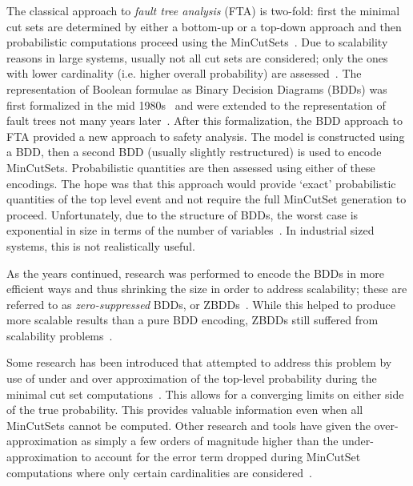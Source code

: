 The classical approach to \textit{fault tree analysis} (FTA) is two-fold: first the minimal cut sets are determined by either a bottom-up or a top-down approach and then probabilistic computations proceed using the MinCutSets~\cite{vesely1981fault,henley1996probabilistic,rausand2003system}. Due to scalability reasons in large systems, usually not all cut sets are considered; only the ones with lower cardinality (i.e. higher overall probability) are assessed~\cite{vesely1981fault,Bozzano:2010:DSA:1951720}. The representation of Boolean formulae as Binary Decision Diagrams (BDDs) was first formalized in the mid 1980s~\cite{bryant1986graph} and were extended to the representation of fault trees not many years later~\cite{rauzy1993new}. After this formalization, the BDD approach to FTA provided a new approach to safety analysis. The model is constructed using a BDD, then a second BDD (usually slightly restructured) is used to encode MinCutSets\cite{rauzy2008binary}. Probabilistic quantities are then assessed using either of these encodings. The hope was that this approach would provide `exact' probabilistic quantities of the top level event and not require the full MinCutSet generation to proceed. Unfortunately, due to the structure of BDDs, the worst case is exponential in size in terms of the number of variables~\cite{bryant1986graph,rauzy1993new,rauzy2008binary}. In industrial sized systems, this is not realistically useful. 

As the years continued, research was performed to encode the BDDs in more efficient ways and thus shrinking the size in order to address scalability; these are referred to as \textit{zero-suppressed} BDDs, or ZBDDs~\cite{minato2001zero}. While this helped to produce more scalable results than a pure BDD encoding, ZBDDs still suffered from scalability problems~\cite{matuzas2015dynamic, jung2008fast}. 

Some research has been introduced that attempted to address this problem by use of under and over approximation of the top-level probability during the minimal cut set computations~\cite{CAV2015:BoCiGrMa}. This allows for a converging limits on either side of the true probability. This provides valuable information even when all MinCutSets cannot be computed. Other research and tools have given the over-approximation as simply a few orders of magnitude higher than the under-approximation to account for the error term dropped during MinCutSet computations where only certain cardinalities are considered~\cite{symbAltaRica, bozzano2003improving, CHEN201391,Bozzano:2010:DSA:1951720}. 


